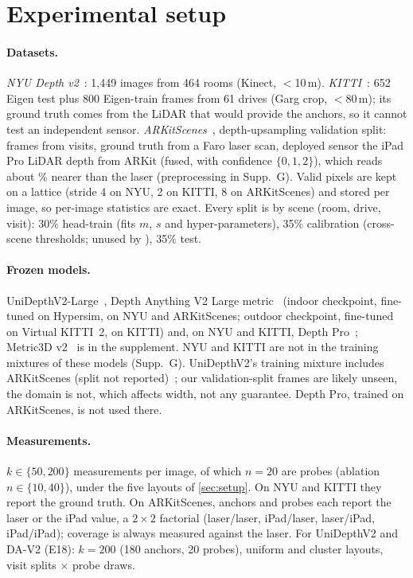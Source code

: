 \section{Experimental setup}
\label{sec:experiments}

\paragraph{Datasets.}
\emph{NYU Depth v2}~\cite{silberman2012nyu}: 1{,}449 images from 464 rooms (Kinect, $<$10\,m).
\emph{KITTI}~\cite{geiger2012kitti}: 652 Eigen test plus 800 Eigen-train frames from 61 drives (Garg crop, $<$80\,m); its ground truth comes from the LiDAR that would provide the anchors, so it cannot test an independent sensor.
\emph{ARKitScenes}~\cite{baruch2021arkitscenes}, depth-upsampling validation split: \NumArkFrames{} frames from \NumArkVisits{} visits, ground truth from a Faro laser scan, deployed sensor the iPad Pro LiDAR depth from ARKit (fused, with confidence $\{0,1,2\}$), which reads about \NumArkIpadOffset\% nearer than the laser (preprocessing in Supp.~G).
Valid pixels are kept on a lattice (stride 4 on NYU, 2 on KITTI, 8 on ARKitScenes) and stored per image, so per-image statistics are exact.
Every split is by scene (room, drive, visit): 30\% head-train (fits $m$, $s$ and hyper-parameters), 35\% calibration (cross-scene thresholds; unused by \mDual), 35\% test.

\paragraph{Frozen models.}
UniDepthV2-Large~\cite{piccinelli2025unidepthv2}, Depth Anything V2 Large metric~\cite{yang2024dav2} (indoor checkpoint, fine-tuned on Hypersim, on NYU and ARKitScenes; outdoor checkpoint, fine-tuned on Virtual KITTI~2, on KITTI) and, on NYU and KITTI, Depth Pro~\cite{bochkovskii2025depthpro}; Metric3D v2~\cite{hu2024metric3dv2} is in the supplement.
NYU and KITTI are not in the training mixtures of these models (Supp.~G).
UniDepthV2's training mixture includes ARKitScenes (split not reported)~\cite{piccinelli2025unidepthv2}; our validation-split frames are likely unseen, the domain is not, which affects width, not any guarantee.
Depth Pro, trained on ARKitScenes, is not used there.

\paragraph{Measurements.}
$k\in\{50,200\}$ measurements per image, of which $n=20$ are probes (ablation $n\in\{10,40\}$), under the five layouts of \cref{sec:setup}.
On NYU and KITTI they report the ground truth.
On ARKitScenes, anchors and probes each report the laser or the iPad value, a $2\times2$ factorial (laser/laser, iPad/laser, laser/iPad, iPad/iPad); coverage is always measured against the laser.
For UniDepthV2 and DA-V2 (E18): $k=200$ (180 anchors, 20 probes), uniform and cluster layouts, \NumReplSplits{} visit splits $\times$ \NumProbeDraws{} probe draws.

